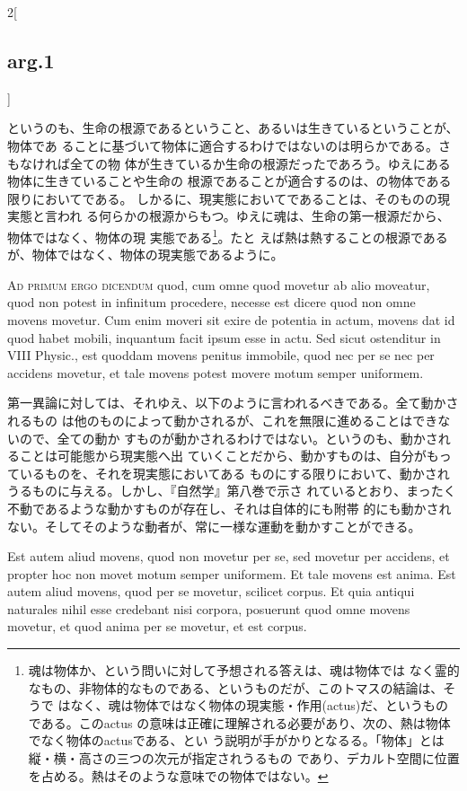 \documentclass[paper=a4paper,fontsize=10pt,jafontsize=9pt,titlepage]{jlreq}
\begin{document}
\begin{paracol}{2}[\subsection{arg.1}]
\switchcolumn

というのも、生命の根源であるということ、あるいは生きているということが、物体であ
ることに基づいて物体に適合するわけではないのは明らかである。さもなければ全ての物
体が生きているか生命の根源だったであろう。ゆえにある物体に生きていることや生命の
根源であることが適合するのは、の物体である限りにおいてである。
しかるに、現実態においてであることは、そのものの現実態と言われ
る何らかの根源からもつ。ゆえに魂は、生命の第一根源だから、物体ではなく、物体の現
実態である\footnote{魂は物体か、という問いに対して予想される答えは、魂は物体では
なく霊的なもの、非物体的なものである、というものだが、このトマスの結論は、そうで
はなく、魂は物体ではなく物体の現実態・作用(actus)だ、というものである。このactus
の意味は正確に理解される必要があり、次の、熱は物体でなく物体のactusである、とい
う説明が手がかりとなるる。「物体」とは縦・横・高さの三つの次元が指定されうるもの
であり、デカルト空間に位置を占める。熱はそのような意味での物体ではない。}。たと
えば熱は熱することの根源であるが、物体ではなく、物体の現実態であるように。

\switchcolumn*[\subsection{ad 1}]

{\scshape Ad primum ergo dicendum} quod, cum omne quod movetur ab alio moveatur,
quod non potest in infinitum procedere, necesse est dicere quod non omne movens
movetur. Cum enim moveri sit exire de potentia in actum, movens dat id quod
habet mobili, inquantum facit ipsum esse in actu. Sed sicut ostenditur in VIII
Physic., est quoddam movens penitus immobile, quod nec per se nec per accidens
movetur, et tale movens potest movere motum semper uniformem.

\switchcolumn

第一異論に対しては、それゆえ、以下のように言われるべきである。全て動かされるもの
は他のものによって動かされるが、これを無限に進めることはできないので、全ての動か
すものが動かされるわけではない。というのも、動かされることは可能態から現実態へ出
ていくことだから、動かすものは、自分がもっているものを、それを現実態においてある
ものにする限りにおいて、動かされうるものに与える。しかし、『自然学』第八巻で示さ
れているとおり、まったく不動であるような動かすものが存在し、それは自体的にも附帯
的にも動かされない。そしてそのような動者が、常に一様な運動を動かすことができる。


\switchcolumn*

Est autem aliud movens, quod non movetur per se, sed movetur per accidens, et
propter hoc non movet motum semper uniformem. Et tale movens est anima. Est
autem aliud movens, quod per se movetur, scilicet corpus. Et quia antiqui
naturales nihil esse credebant nisi corpora, posuerunt quod omne movens movetur,
et quod anima per se movetur, et est corpus.



\end{paracol}
\end{document}
